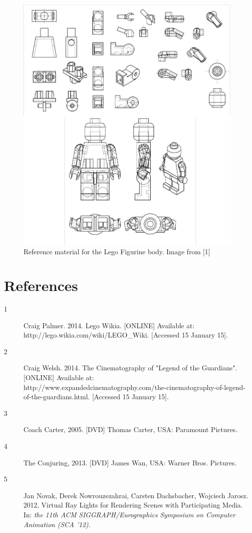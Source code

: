 \documentclass[12pt,a4paper]{article}
\begin{document}
\begin{figure}
\includegraphics[scale=0.25]{images/BESTPICTURE.jpg} 
\caption{Reference material for the Lego Figurine body. Image from [1]}
\end{figure}

\clearpage
\section*{References}
\begin{description}
\item[1] Craig Palmer. 2014. Lego Wikia. [ONLINE] Available at:\\ http://lego.wikia.com/wiki/LEGO\_Wiki. [Accessed 15 January 15].
\item[2] Craig Welsh. 2014. The Cinematography of "Legend of the Guardians". [ONLINE] Available at: \\ http://www.expandedcinematography.com/the-cinematography-of-legend-of-the-guardians.html. [Accessed 15 January 15].
\item[3] Coach Carter, 2005. [DVD] Thomas Carter, USA: Paramount Pictures.
\item[4] The Conjuring, 2013. [DVD] James Wan, USA: Warner Bros. Pictures.
\item[5] Jan Novak, Derek Nowrouzezahrai, Carsten Dachsbacher, Wojciech Jarosz. 2012, Virtual Ray Lights for Rendering Scenes with Participating Media. In: \textit{the 11th ACM SIGGRAPH/Eurographics Symposium on Computer Animation (SCA '12)}.
\end{description}
\end{document}
